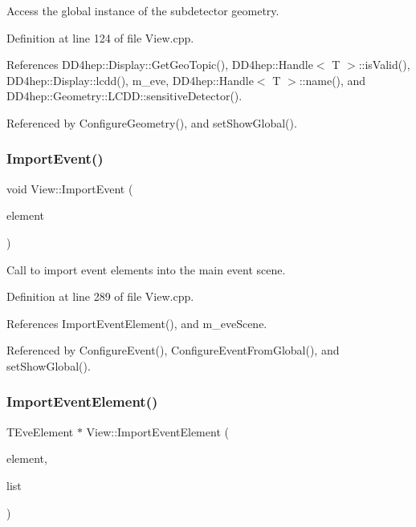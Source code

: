 Access the global instance of the subdetector geometry. 



Definition at line 124 of file View.\+cpp.



References D\+D4hep\+::\+Display\+::\+Get\+Geo\+Topic(), D\+D4hep\+::\+Handle$<$ T $>$\+::is\+Valid(), D\+D4hep\+::\+Display\+::lcdd(), m\+\_\+eve, D\+D4hep\+::\+Handle$<$ T $>$\+::name(), and D\+D4hep\+::\+Geometry\+::\+L\+C\+D\+D\+::sensitive\+Detector().



Referenced by Configure\+Geometry(), and set\+Show\+Global().

\hypertarget{class_d_d4hep_1_1_view_a3fcf261f808c5ed9687f864286309123}{}\label{class_d_d4hep_1_1_view_a3fcf261f808c5ed9687f864286309123} 
\subsubsection{\texorpdfstring{Import\+Event()}{ImportEvent()}}
{\footnotesize\ttfamily void View\+::\+Import\+Event (\begin{DoxyParamCaption}\item[{T\+Eve\+Element $\ast$}]{element }\end{DoxyParamCaption})\hspace{0.3cm}{\ttfamily [virtual]}}



Call to import event elements into the main event scene. 



Definition at line 289 of file View.\+cpp.



References Import\+Event\+Element(), and m\+\_\+eve\+Scene.



Referenced by Configure\+Event(), Configure\+Event\+From\+Global(), and set\+Show\+Global().

\hypertarget{class_d_d4hep_1_1_view_acd696f9f50bda0d632cec822ab1f4672}{}\label{class_d_d4hep_1_1_view_acd696f9f50bda0d632cec822ab1f4672} 
\subsubsection{\texorpdfstring{Import\+Event\+Element()}{ImportEventElement()}}
{\footnotesize\ttfamily T\+Eve\+Element $\ast$ View\+::\+Import\+Event\+Element (\begin{DoxyParamCaption}\item[{T\+Eve\+Element $\ast$}]{element,  }\item[{\hyperlink{class_t_eve_element_list}{T\+Eve\+Element\+List} $\ast$}]{list }\end{DoxyParamCaption})\hspace{0.3cm}{\ttfamily [virtual]}}



